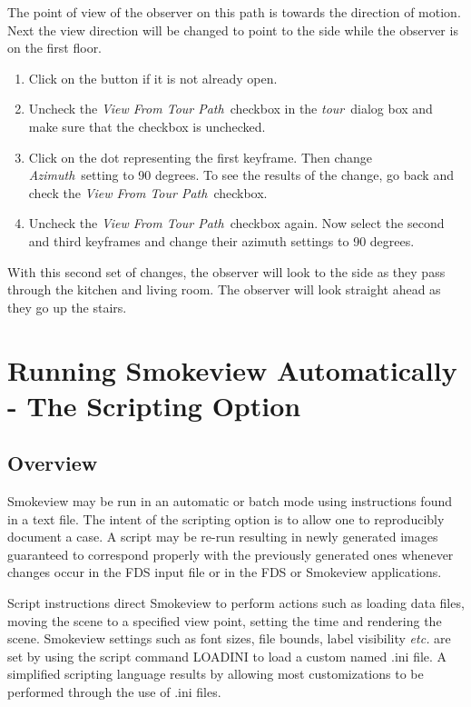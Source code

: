 \documentclass[11pt,twoside]{book}
\newcommand{\frameit}[1]{\fbox{\tt #1}}
\begin{document}
The point of view of the observer on this path is towards the
direction of motion. Next the view direction will be changed to
point to the side while the observer is on the first floor.

\begin{enumerate}
\item Click on the \frameit{Advanced Settings} button if it is not already open.

\item Uncheck the {\em View From Tour Path}\ checkbox in the {\em tour}\
dialog box and make sure that the \frameit{X,Y,Z View} checkbox is
unchecked.

\item Click on the dot representing the first keyframe. Then
change {\em Azimuth}\ setting to 90 degrees.  To see the results of
the change, go back and check the {\em View From Tour Path}\
checkbox.

\item Uncheck the {\em View From Tour Path}\ checkbox again. Now
select the second and third keyframes and change their azimuth
settings to 90 degrees.
\end{enumerate}

With this second set of changes, the observer will look to the
side as they pass through the kitchen and living room.  The
observer will look straight ahead as they go up the stairs.


\chapter{Running Smokeview Automatically - The Scripting Option}
\section{Overview}
Smokeview may be run in an automatic or batch mode using
instructions found in a text file.
The intent of the scripting option is to allow one to reproducibly document a case.
A script may be re-run resulting in newly generated images guaranteed to correspond properly with the previously generated
ones whenever changes occur in the FDS input file or in the FDS or Smokeview applications.

Script instructions direct Smokeview to perform actions such as loading data files, moving the scene to a specified view point, setting the time and rendering the scene.
Smokeview settings such as font sizes, file bounds, label visibility
{\em etc.} are set by using the script command LOADINI to load a custom named .ini file.
A simplified scripting language results by allowing
most customizations to be performed through the use of .ini files.
\end{document}
